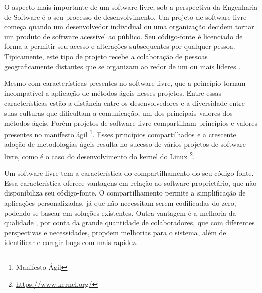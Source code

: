 O aspecto mais importante de um software livre, sob a perspectiva da Engenharia de Software é o seu processo de desenvolvimento. Um projeto de software livre começa quando um desenvolvedor individual ou uma organização decidem tornar um produto de software acessível ao público. Seu código-fonte é licenciado de forma a permitir seu acesso e alterações subsequentes por qualquer pessoa. Tipicamente, este tipo de projeto recebe a colaboração de pessoas geograficamente distantes que se organizam ao redor de um ou mais líderes \cite{corbucci2011freemethods}. 

Mesmo com características presentes no software livre, que a princípio tornam incompatível a aplicação de métodos ágeis nesses projetos. Entre essas características estão a distância entre os desenvolvedores e a diversidade entre suas culturas que dificultam a comunicação, um dos principais valores dos métodos ágeis. Porém projetos de software livre compartilham princípios e valores presentes no manifesto ágil \footnote{Manifesto Ágil}. Esses princípios compartilhados e a crescente adoção de metodologias ágeis resulta no sucesso de vários projetos de software livre, como é o caso do desenvolvimento do kernel do Linux \footnote{\url{https://www.kernel.org/}}. %

Um software livre tem a característica do compartilhamento do seu código-fonte. Essa característica oferece vantagens em relação ao software proprietário, que não disponibiliza seu código-fonte. O compartilhamento permite a simplificação de aplicações personalizadas, já que não necessitam serem codificadas do zero, podendo se basear em soluções existentes. Outra vantagem é a melhoria da qualidade \cite{Raymond, 1999}, por conta da grande quantidade de colaboradores, que com diferentes perspectivas e necessidades, propõem melhorias para o sistema, além de identificar e corrgir bugs com mais rapidez.



